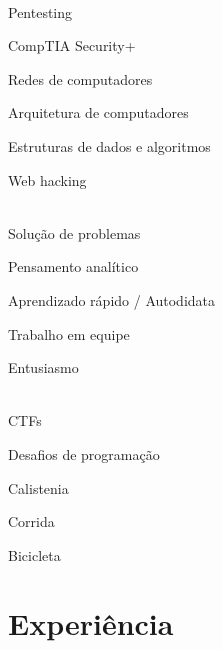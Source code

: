 \documentclass[a4paper]{article}
\begin{document}
\begin{paracol}{2}
\bigskip

 \\[0.5em]
Pentesting

CompTIA Security+

Redes de computadores

Arquitetura de computadores

Estruturas de dados e algoritmos

Web hacking

\bigskip

 \\[0.5em]
Solução de problemas

Pensamento analítico

Aprendizado rápido / Autodidata

Trabalho em equipe

Entusiasmo

\bigskip

\\[0.5em]

CTFs

Desafios de programação

Calistenia

Corrida

Bicicleta

\bigskip



\switchcolumn

\small
\justify

\vspace{-5em}

\section*{\faBriefcase \; Experiência}


\end{paracol}
\end{document}
